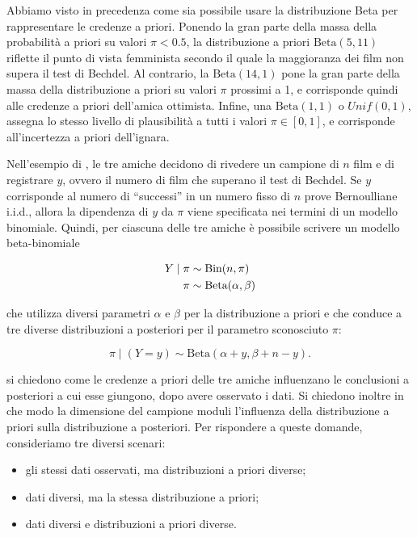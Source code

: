 \documentclass[
  11pt,
]{krantz}
\providecommand{\tightlist}{%
  \setlength{\itemsep}{0pt}\setlength{\parskip}{0pt}}
\theoremstyle{definition}
\theoremstyle{definition}
\theoremstyle{definition}
\theoremstyle{definition}
\theoremstyle{remark}
\begin{document}
Abbiamo visto in precedenza come sia possibile usare la distribuzione Beta per rappresentare le credenze a priori. Ponendo la gran parte della massa della probabilità a priori su valori \(\pi < 0.5\), la distribuzione a priori \(\text{Beta}(5, 11)\) riflette il punto di vista femminista secondo il quale la maggioranza dei film non supera il test di Bechdel. Al contrario, la \(\text{Beta}(14,1)\) pone la gran parte della massa della distribuzione a priori su valori \(\pi\) prossimi a 1, e corrisponde quindi alle credenze a priori dell'amica ottimista. Infine, una \(\text{Beta}(1 ,1)\) o \(Unif(0, 1)\), assegna lo stesso livello di plausibilità a tutti i valori \(\pi \in [0, 1]\), e corrisponde all'incertezza a priori dell'ignara.

Nell'esempio di \citet{Johnson2022bayesrules}, le tre amiche decidono di rivedere un campione di \(n\) film e di registrare \(y\), ovvero il numero di film che superano il test di Bechdel. Se \(y\) corrisponde al numero di ``successi'' in un numero fisso di \(n\) prove Bernoulliane i.i.d., allora la dipendenza di \(y\) da \(\pi\) viene specificata nei termini di un modello binomiale. Quindi, per ciascuna delle tre amiche è possibile scrivere un modello beta-binomiale

\begin{align}
Y \mid \pi & \sim \mbox{Bin}(n, \pi)  \notag\\
\pi & \sim \mbox{Beta}(\alpha, \beta) \notag
\end{align}

che utilizza diversi parametri \(\alpha\) e \(\beta\) per la distribuzione a priori e che conduce a tre diverse distribuzioni a posteriori per il parametro sconosciuto \(\pi\):

\begin{equation}
\pi \mid (Y = y) \sim \mbox{Beta}(\alpha + y, \beta + n - y).
\end{equation}

\citet{Johnson2022bayesrules} si chiedono come le credenze a priori delle tre amiche influenzano le conclusioni a posteriori a cui esse giungono, dopo avere osservato i dati. Si chiedono inoltre in che modo la dimensione del campione moduli l'influenza della distribuzione a priori sulla distribuzione a posteriori. Per rispondere a queste domande, \citet{Johnson2022bayesrules} consideriamo tre diversi scenari:

\begin{itemize}
\tightlist
\item
  gli stessi dati osservati, ma distribuzioni a priori diverse;
\item
  dati diversi, ma la stessa distribuzione a priori;
\item
  dati diversi e distribuzioni a priori diverse.
\end{itemize}
\end{document}

